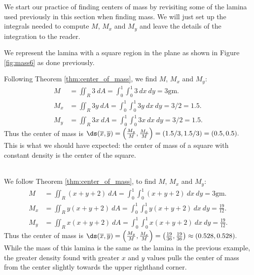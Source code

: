 We start our practice of finding centers of mass by revisiting some of the lamina used previously in this section when finding mass. We will  just set up the integrals needed to compute $M$, $M_x$ and $M_y$ and leave the details of the integration to the reader.\\

{We represent the lamina with a square region in the plane as shown in Figure \ref{fig:mass6} as done previously. 

Following Theorem \ref{thm:center_of_mass}, we find $M$, $M_x$ and $M_y$:
\begin{align*}
M &= \iint_R 3\ dA = \int_0^1\int_0^1 3\ dx\ dy =3\text{gm}.\\
M_x &= \iint_R 3y\ dA = \int_0^1\int_0^1 3y\ dx\ dy =3/2 = 1.5.\\
M_y &= \iint_R 3x\ dA = \int_0^1\int_0^1 3x\ dx\ dy =3/2 = 1.5.
\end{align*}
Thus the center of mass is $\ds (\overline{x},\overline{y}) = \left(\frac{M_y}M,\frac{M_x}M\right) = (1.5/3,1.5/3) = (0.5,0.5).$ This is what we should have expected: the center of mass of a square with constant density is the center of the square.
}\\

{We follow Theorem \ref{thm:center_of_mass}, to find $M$, $M_x$ and $M_y$:
\begin{align*}
M &= \iint_R (x+y+2)\ dA = \int_0^1\int_0^1 (x+y+2)\ dx\ dy =3\text{gm}.\\
M_x &= \iint_R y(x+y+2)\ dA = \int_0^1\int_0^1 y(x+y+2)\ dx\ dy =\frac{19}{12}.\\
M_y &= \iint_R x(x+y+2)\ dA = \int_0^1\int_0^1 x(x+y+2)\ dx\ dy =\frac{19}{12}.
\end{align*}
Thus the center of mass is $\ds (\overline{x},\overline{y}) = \left(\frac{M_y}M,\frac{M_x}M\right) = \left(\frac{19}{36},\frac{19}{36}\right) \approx (0.528,0.528).$ While the mass of this lamina is the same as the lamina in the previous example, the greater density found with greater $x$ and $y$ values pulls the center of mass from the center slightly towards the upper righthand corner.
}\\

